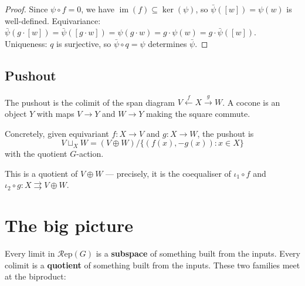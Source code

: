 \documentclass[12pt,a4paper]{article}
\theoremstyle{definition}
\theoremstyle{remark}
\newcommand{\im}{\operatorname{im}}
\newcommand{\Rep}{\mathcal{R}\mathrm{ep}}
\begin{document}
\begin{proof}
Since $\psi \circ f = 0$, we have $\im(f) \subseteq \ker(\psi)$, so
$\bar\psi([w]) = \psi(w)$ is well-defined. Equivariance:
$\bar\psi(g \cdot [w]) = \bar\psi([g \cdot w]) = \psi(g \cdot w) = g \cdot \psi(w)
= g \cdot \bar\psi([w])$.
Uniqueness: $q$ is surjective, so $\bar\psi \circ q = \psi$ determines $\bar\psi$.
\end{proof}

\subsection{Pushout}

The pushout is the colimit of the span diagram $V \xleftarrow{f} X \xrightarrow{g} W$.
A cocone is an object $Y$ with maps $V \to Y$ and $W \to Y$ making the square commute.

Concretely, given equivariant $f\colon X \to V$ and $g\colon X \to W$, the pushout is
\[
V \sqcup_X W = (V \oplus W) / \{(f(x), -g(x)) : x \in X\}
\]
with the quotient $G$-action.

\medskip
\begin{center}
\end{center}

This is a quotient of $V \oplus W$ --- precisely, it is the coequaliser of
$\iota_1 \circ f$ and $\iota_2 \circ g\colon X \rightrightarrows V \oplus W$.

\section{The big picture}

Every limit in $\Rep(G)$ is a \textbf{subspace} of something built from the inputs.
Every colimit is a \textbf{quotient} of something built from the inputs. These two
families meet at the biproduct:
\end{document}
